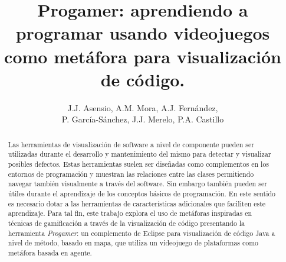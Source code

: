 \documentclass{llncs}
\begin{document}

\title{Progamer: aprendiendo a programar usando videojuegos como metáfora para visualización de código.}


\author{J.J. Asensio, A.M. Mora, A.J. Fernández, \\P. García-Sánchez, J.J. Merelo, P.A. Castillo}

\maketitle
%
%
\begin{abstract} 
Las herramientas de visualización de software a nivel de componente
pueden ser utilizadas durante el desarrollo y mantenimiento del mismo
para detectar y visualizar posibles defectos. Estas herramientas
suelen ser diseñadas como complementos en los entornos de programación y
muestran las relaciones entre las clases permitiendo navegar también
visualmente a través del software. Sin embargo también pueden ser
útiles durante el aprendizaje de los conceptos básicos de
programación. En este sentido es necesario dotar a las herramientas de
características adicionales que faciliten este aprendizaje. Para tal
fin, este trabajo explora el uso de metáforas inspiradas en técnicas de gamificación a través de la visualización de código presentando la herramienta \emph{Progamer}: un
complemento de Eclipse para visualización de código Java a nivel de método,
basado en mapa, que utiliza un videojuego de plataformas como metáfora basada en agente.
\end{abstract}


%
%
\end{document}

